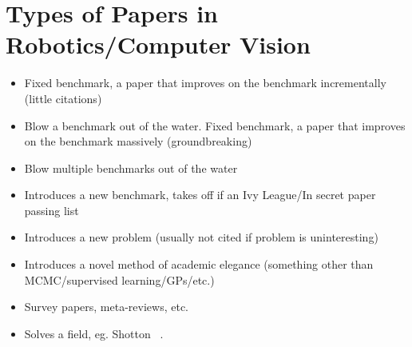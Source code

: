 \section{Types of Papers in Robotics/Computer Vision}
\begin{itemize}
  \item Fixed benchmark, a paper that improves on the benchmark incrementally (little citations)
  \item Blow a benchmark out of the water. Fixed benchmark, a paper that improves on the benchmark massively (groundbreaking)
  \item Blow multiple benchmarks out of the water
  \item Introduces a new benchmark, takes off if an Ivy League/In secret paper passing list
  \item Introduces a new problem (usually not cited if problem is uninteresting)
  \item Introduces a novel method of academic elegance (something other than MCMC/supervised learning/GPs/etc.)
  \item Survey papers, meta-reviews, etc.
  \item Solves a field, eg. Shotton \etal~\cite{shotton2013real}. 
\end{itemize}


